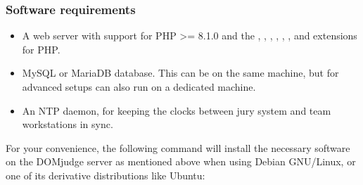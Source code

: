 \documentclass[a4paper,10pt,english,openany]{sphinxmanual}
\begin{document}
\subsubsection{Software requirements}
\label{\detokenize{install-domserver:software-requirements}}\begin{itemize}
\item {} 
\sphinxAtStartPar
A web server with support for PHP \textgreater{}= 8.1.0 and the , , ,
, , ,  and  extensions for PHP.

\item {} 
\sphinxAtStartPar
MySQL or MariaDB database. This can be on the same machine, but for
advanced setups can also run on a dedicated machine.

\item {} 
\sphinxAtStartPar
An NTP daemon, for keeping the clocks between jury system and team
workstations in sync.

\end{itemize}

\sphinxAtStartPar
For your convenience, the following command will install the necessary
software on the DOMjudge server as mentioned above when using Debian
GNU/Linux, or one of its derivative distributions like Ubuntu:

\begin{sphinxVerbatim}[commandchars=\\\{\}]
           \PYGZbs{}
             \PYGZbs{}
             
\end{sphinxVerbatim}
\end{document}
